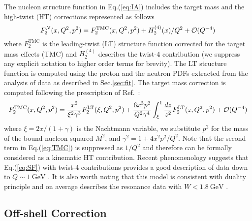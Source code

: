 \documentclass[%
      aps,
      prd,
      floatfix,
      preprintnumbers,
      preprint,
      showpacs,
      nofootinbib,
      tightenlines,
      amssymb,
      amsmath
]{revtex4-1}
\newcommand{\gev}    {\:\mathrm{GeV}}
\newcommand{\eq}[1]{Eq.(\ref{#1})}
\begin{document}
The nucleon structure function in \eq{eq:IA} includes  
the target mass and the high-twist (HT) corrections represented as follows
%
\begin{equation}\label{eq:SF}
F_2^N(x,Q^2,p^2) = F_2^{\text{\rm TMC}}(x,Q^2,p^2)
        + H_2^{(4)}(x)/Q^{2} + {\mathcal{O}}(Q^{-4}) 
\end{equation}
%
where $F_2^{\text{TMC}}$ is the leading-twist (LT) structure function
corrected for the target mass effects (TMC) and $H_2^{(4)}$ describes the
twist-4 contribution (we suppress any explicit notation to higher order terms for brevity).
The LT structure function is computed using the proton and the neutron PDFs extracted from the 
analysis of data as described in Sec.\ref{sec:fit}.
The target mass correction is computed following the prescription of Ref.~\cite{Georgi:1976ve}:
\begin{equation}\label{eq:TMC}
F_2^{\text{\rm TMC}}(x,Q^2,p^2) = \frac{x^2}{\xi^2 \gamma^3} F_2^{\rm LT}(\xi,Q^2,p^2) + 
\frac{6x^3p^2}{Q^2\gamma^4}\int^1_\xi \frac{dz}{z^2} F_2^{\rm LT}(z,Q^2,p^2) + {\mathcal{O}}(Q^{-4}) 
\end{equation}
where $\xi=2x/(1+\gamma)$ is the Nachtmann variable, we substitute $p^2$ for the
mass of the bound nucleon squared $M^2$, and $\gamma^2=1+4x^2 p^2/Q^2$. 
Note that the second term in \eq{eq:TMC} is suppressed as $1/Q^2$ and 
therefore can be formally considered as a kinematic HT contribution. 
%
Recent phenomenology suggests that \eq{eq:SF} with twist-4 contributions 
provides a good description of data down to $Q\sim 1\gev$
\cite{Alekhin:2007fh}.
%
It is also worth noting that this model is consistent with duality principle and on average
describes the resonance data with $W<1.8\gev$ \cite{Alekhin:2007fh,Malace:2009kw}.


\subsection{Off-shell Correction} 
\label{sec:OS} 
\end{document}
